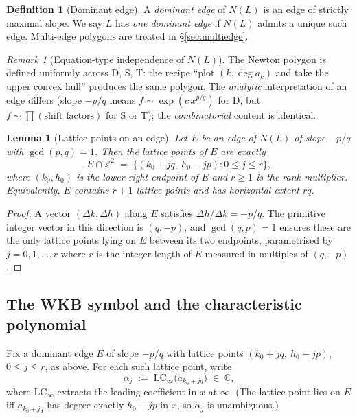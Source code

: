 \documentclass[11pt,a4paper]{article}
\theoremstyle{plain}
\newtheorem{lemma}[theorem]{Lemma}
\theoremstyle{definition}
\newtheorem{definition}[theorem]{Definition}
\theoremstyle{remark}
\newtheorem{remark}[theorem]{Remark}
\newcommand{\opD}{\mathrm{D}}                     %
\newcommand{\opS}{\mathrm{S}}                     %
\newcommand{\opT}{\mathrm{T}}                     %
\newcommand{\LCinf}{\mathrm{LC}_\infty}
\newcommand{\NL}{N(L)}
\begin{document}
\begin{definition}[Dominant edge]\label{def:dominant-edge}
A \emph{dominant edge} of $\NL$ is an edge of strictly maximal slope. We
say $L$ has \emph{one dominant edge} if $\NL$ admits a unique such edge.
Multi-edge polygons are treated in \S\ref{sec:multiedge}.
\end{definition}

\begin{remark}[Equation-type independence of $N(L)$]\label{rem:Newton-uniform}
The Newton polygon is defined uniformly across $\opD$, $\opS$, $\opT$:
the recipe ``plot $(k, \deg a_k)$ and take the upper convex hull'' produces
the same polygon. The \emph{analytic} interpretation of an edge differs
(slope $-p/q$ means $f \sim \exp(c\, x^{p/q})$ for $\opD$, but
$f \sim \prod (\text{shift factors})$ for $\opS$ or $\opT$); the
\emph{combinatorial} content is identical.
\end{remark}

\begin{lemma}[Lattice points on an edge]\label{lem:lattice-on-edge}
Let $E$ be an edge of $\NL$ of slope $-p/q$ with $\gcd(p, q) = 1$. Then
the lattice points of $E$ are exactly
\[
   E \cap \mathbb{Z}^2
   \;=\;
   \big\{(k_0 + jq,\ h_0 - jp) : 0 \le j \le r\big\},
\]
where $(k_0, h_0)$ is the lower-right endpoint of $E$ and $r \ge 1$ is the
\emph{rank multiplier}. Equivalently, $E$ contains $r + 1$ lattice points
and has horizontal extent $rq$.
\end{lemma}

\begin{proof}
A vector $(\Delta k, \Delta h)$ along $E$ satisfies
$\Delta h / \Delta k = -p/q$. The primitive integer vector in this
direction is $(q, -p)$, and $\gcd(q, p) = 1$ ensures these are the only
lattice points lying on $E$ between its two endpoints, parametrised by
$j = 0, 1, \dots, r$ where $r$ is the integer length of $E$ measured in
multiples of $(q, -p)$.
\end{proof}

\subsection{The WKB symbol and the characteristic polynomial}\label{ssec:prelim-WKB}

Fix a dominant edge $E$ of slope $-p/q$ with lattice points
$(k_0 + jq,\ h_0 - jp)$, $0 \le j \le r$, as above. For each such lattice
point, write
\[
   \alpha_j
   \;:=\;
   \LCinf\big(a_{k_0 + jq}\big)
   \;\in\; \mathbb{C},
\]
where $\LCinf$ extracts the leading coefficient in $x$ at $\infty$.
(The lattice point lies on $E$ iff $a_{k_0 + jq}$ has degree exactly
$h_0 - jp$ in $x$, so $\alpha_j$ is unambiguous.)
\end{document}
